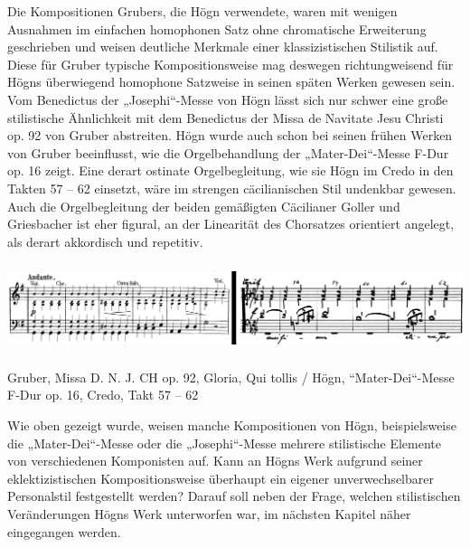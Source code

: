 Die Kompositionen Grubers, die Högn verwendete, waren mit wenigen
Ausnahmen im einfachen homophonen Satz ohne chromatische Erweiterung
geschrieben und weisen deutliche Merkmale einer klassizistischen
Stilistik auf. Diese für Gruber typische Kompositionsweise mag deswegen
richtungweisend für Högns überwiegend homophone Satzweise in seinen
späten Werken gewesen sein. Vom Benedictus der „Josephi“-Messe von Högn
lässt sich nur schwer eine große stilistische Ähnlichkeit mit dem
Benedictus der Missa de Navitate Jesu Christi op. 92 von Gruber
abstreiten. Högn wurde auch schon bei seinen frühen Werken von Gruber
beeinflusst, wie die Orgelbehandlung der „Mater-Dei“-Messe F-Dur op. 16
zeigt. Eine derart ostinate Orgelbegleitung, wie sie Högn im Credo in
den Takten 57 – 62 einsetzt, wäre im strengen cäcilianischen Stil
undenkbar gewesen. Auch die Orgelbegleitung der beiden gemäßigten
Cäcilianer Goller und Griesbacher ist eher figural, an der Linearität
des Chorsatzes orientiert angelegt, als derart akkordisch und
repetitiv.


\includegraphics[width=15.977cm,height=2.589cm]{pictures/zulassungsarbeit-img094.png}


Gruber, Missa D. N. J. CH op. 92,
Gloria, Qui tollis / Högn, “Mater-Dei“-Messe F-Dur op. 16, Credo, Takt
57 – 62

Wie oben gezeigt wurde, weisen manche Kompositionen von Högn,
beispielsweise die „Mater-Dei“-Messe oder die „Josephi“-Messe mehrere
stilistische Elemente von verschiedenen Komponisten auf. Kann an Högns
Werk aufgrund seiner eklektizistischen Kompositionsweise überhaupt ein
eigener unverwechselbarer Personalstil festgestellt werden? Darauf soll
neben der Frage, welchen stilistischen Veränderungen Högns Werk
unterworfen war, im nächsten Kapitel näher eingegangen werden.